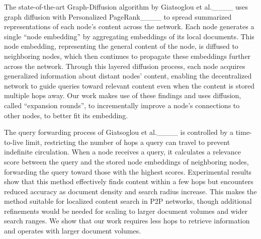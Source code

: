 The state-of-the-art Graph-Diffusion algorithm by Giatsoglou et al.____ uses graph diffusion with Personalized PageRank____ to spread summarized representations of each node’s content across the network. Each node generates a single ``node embedding'' by aggregating embeddings of its local documents. This node embedding, representing the general content of the node, is diffused to neighboring nodes, which then continues to propagate these embeddings further across the network. Through this layered diffusion process, each node acquires generalized information about distant nodes’ content, enabling the decentralized network to guide queries toward relevant content even when the content is stored multiple hops away.
Our work makes use of these findings and uses diffusion, called ``expansion rounds'', to incrementally improve a node's connections to other nodes, to better fit its embedding.

The query forwarding process of Giatsoglou et al.____ is controlled by a time-to-live limit, restricting the number of hops a query can travel to prevent indefinite circulation. When a node receives a query, it calculates a relevance score between the query and the stored node embeddings of neighboring nodes, forwarding the query toward those with the highest scores. Experimental results show that this method effectively finds content within a few hops but encounters reduced accuracy as document density and search radius increase. This makes the method suitable for localized content search in P2P networks, though additional refinements would be needed for scaling to larger document volumes and wider search ranges.
We show that our work requires less hops to retrieve information and operates with larger document volumes.